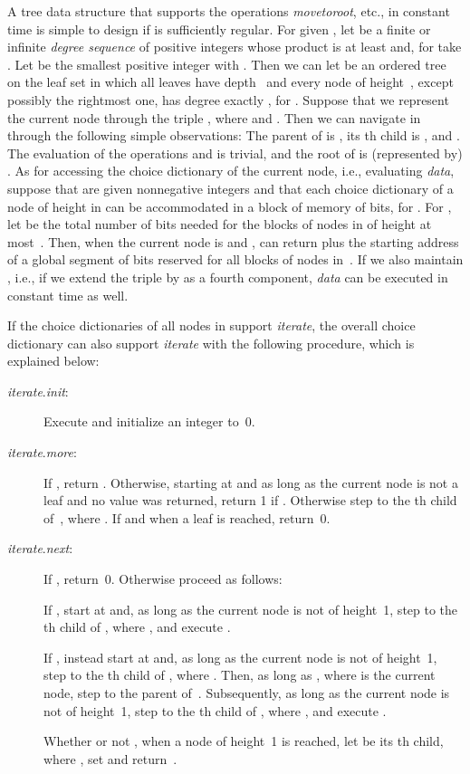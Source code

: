 \documentclass[envcountsame,envcountsect,undated,nolinenumbers]{lnthi}
\def\Tvn#1{\hbox{\textit{#1\/}}}
\begin{document}
A tree data structure that supports the operations
\Tvn{movetoroot}, etc., in constant time is simple
to design if  is sufficiently regular.
For given , let  be
a finite or
infinite
\emph{degree sequence}
of positive integers whose product
is at least 
and, for 
take .
Let  be the smallest positive
integer with .
Then we can let  be an ordered tree on the leaf
set  in which all leaves have
depth~ and every node of height~, except
possibly the rightmost one, has degree exactly ,
for .
Suppose that we represent the current node 
through the triple , where
 and .
Then we can navigate in  through the following
simple observations:
The parent of  is
,
its th child is
,
and .
The evaluation of the operations
 and  is trivial,
and the root of  is (represented by) .
As for accessing the choice dictionary
of the current node, i.e., evaluating \Tvn{data},
suppose that  are given nonnegative
integers and that each choice dictionary of a
node of height  in  can be accommodated in
a block of memory of  bits, for .
For , let
 be
the total number of bits needed for the
blocks of nodes in  of height at most~.
Then, when the current node is  and ,
 can return 
plus the starting address of a global segment of
 bits reserved for all blocks of nodes in~.
If we also maintain , i.e., if we extend the
triple  by  as a fourth component,
\Tvn{data} can be executed in constant time as well.

If the choice dictionaries of all nodes in 
support \Tvn{iterate}, the overall choice
dictionary can also support \Tvn{iterate}
with the following procedure, which is explained
below:

\begin{description}
\item[\normalfont\Tvn{iterate}.\Tvn{init}:]
Execute 
and initialize an integer  to~0.
\item[\normalfont\Tvn{iterate}.\Tvn{more}:]
If , return .
Otherwise,
starting at  and as long as the current node
 is not a leaf and no value was returned,
return 1 if .
Otherwise step to the th child of~,
where .
If and when a leaf is reached, return~0.
\item[\normalfont\Tvn{iterate}.\Tvn{next}:]
If , return~0.
Otherwise proceed as follows:

If , start at  and, as long as the current node
 is not of height~1,
step to the th child  of ,
where ,
and execute .

If , instead start at  and, as long as the current node 
is not of height~1, step to the th child of ,
where .
Then, as long as ,
where  is the current node, step to
the parent of~.
Subsequently, as long as the current node 
is not of height~1,
step to the th child  of ,
where ,
and execute .

Whether or not ,
when a node  of height~1 is reached,
let  be its th child,
where ,
set  and return~.
\end{description}
\end{document}
